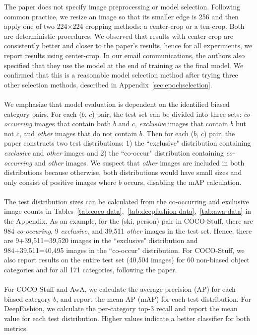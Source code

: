 The paper does not specify image preprocessing or model selection. Following common practice, we resize an image so that its smaller edge is 256 and then apply one of two 224$\times$224 cropping methods: a center-crop or a ten-crop. Both are deterministic procedures. We observed that results with center-crop are consistently better and closer to the paper's results, hence for all experiments, we report results using center-crop. In our email communications, the authors also specified that they use the model at the end of training as the final model. We confirmed that this is a reasonable model selection method after trying three other selection methods, described in Appendix~\ref{sec:epochselection}.\\
\\
We emphasize that model evaluation is dependent on the identified biased category pairs. For each ($b$, $c$) pair, the test set can be divided into three sets: \emph{co-occurring} images that contain both $b$ and $c$, \emph{exclusive} images that contain $b$ but not $c$, and \emph{other} images that do not contain $b$. Then for each ($b$, $c$) pair, the paper constructs two test distributions: 1) the ``exclusive" distribution containing \emph{exclusive} and \emph{other} images and 2) the ``co-occur" distribution containing \emph{co-occurring} and \emph{other} images. We suspect that \emph{other} images are included in both distributions because otherwise, both distributions would have small sizes and only consist of positive images where $b$ occurs, disabling the mAP calculation.\\
\\
The test distribution sizes can be calculated from the co-occurring and exclusive image counts in Tables~\ref{tab:coco-data},~\ref{tab:deepfashion-data},~\ref{tab:awa-data} in the Appendix. As an example, for the (ski, person) pair in COCO-Stuff, there are 984 \emph{co-occuring}, 9 \emph{exclusive}, and 39,511 \emph{other} images in the test set. Hence, there are 9+39,511=39,520 images in the ``exclusive" distribution and 984+39,511=40,495 images in the ``co-occur" distribution. For COCO-Stuff, we also report results on the entire test set (40,504 images) for 60 non-biased object categories and for all 171 categories, following the paper.\\
\\
For COCO-Stuff and AwA, we calculate the average precision (AP) for each biased category $b$, and report the mean AP (mAP) for each test distribution. For DeepFashion, we calculate the per-category top-3 recall and report the mean value for each test distribution. Higher values indicate a better classifier for both metrics. 


